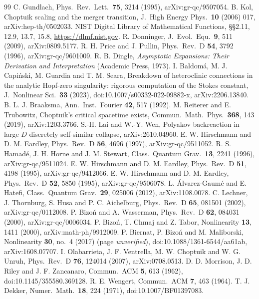 \documentclass[aps,prd,onecolumn,superscriptaddress,nofootinbib,10pt]{revtex4-2}
\begin{document}
\begin{thebibliography}{99}
 C. Gundlach, Phys.\ Rev.\ Lett.\ \textbf{75}, 3214 (1995), arXiv:gr-qc/9507054.
 B. Kol, Choptuik scaling and the merger transition, J.\ High Energy Phys.\ \textbf{10} (2006) 017,
arXiv:hep-th/0502033.
 NIST Digital Library of Mathematical Functions, \S\S2.11, 12.9, 13.7, 15.8, \url{https://dlmf.nist.gov}.
 R. Donninger, J.\ Evol.\ Equ.\ \textbf{9}, 511 (2009), arXiv:0809.5177.
 R. H. Price and J. Pullin, Phys.\ Rev.\ D \textbf{54}, 3792 (1996), arXiv:gr-qc/9601009.
 R. B. Dingle, \emph{Asymptotic Expansions: Their Derivation and Interpretation} (Academic Press,
1973).
 I. Baldom\'a, M. J. Capi\'nski, M. Guardia and T. M. Seara, Breakdown of heteroclinic connections
in the analytic Hopf-zero singularity: rigorous computation of the Stokes constant, J.\ Nonlinear Sci.\ \textbf{33} (2023),
doi:10.1007/s00332-022-09882-x, arXiv:2206.13840.
 B. L. J. Braaksma, Ann.\ Inst.\ Fourier \textbf{42}, 517 (1992).
 M. Reiterer and E. Trubowitz, Choptuik's critical spacetime exists, Commun.\ Math.\ Phys.\
\textbf{368}, 143 (2019), arXiv:1203.3766.
 S.-H. Lai and W.-Y. Wen, Polyakov backreaction in large $D$ discretely self-similar collapse,
arXiv:2610.04960.
 E. W. Hirschmann and D. M. Eardley, Phys.\ Rev.\ D \textbf{56}, 4696 (1997),
arXiv:gr-qc/9511052.
 R. S. Hamad\'e, J. H. Horne and J. M. Stewart, Class.\ Quantum Grav.\ \textbf{13}, 2241
(1996), arXiv:gr-qc/9511024.
 E. W. Hirschmann and D. M. Eardley, Phys.\ Rev.\ D \textbf{51}, 4198 (1995),
arXiv:gr-qc/9412066.
 E. W. Hirschmann and D. M. Eardley, Phys.\ Rev.\ D \textbf{52}, 5850 (1995),
arXiv:gr-qc/9506078.
 L. \'Alvarez-Gaum\'e and E. Hatefi, Class.\ Quantum Grav.\ \textbf{29}, 025006 (2012),
arXiv:1108.0078.
 C. Lechner, J. Thornburg, S. Husa and P. C. Aichelburg, Phys.\ Rev.\ D \textbf{65}, 081501
(2002), arXiv:gr-qc/0112008.
 P. Bizo\'n and A. Wasserman, Phys.\ Rev.\ D \textbf{62}, 084031 (2000), arXiv:gr-qc/0006034.
\bibitem{BizonChmajTabor2000} P. Bizo\'n, T. Chmaj and Z. Tabor, Nonlinearity \textbf{13}, 1411 (2000),
arXiv:math-ph/9912009.
 P. Biernat, P. Bizo\'n and M. Maliborski, Nonlinearity \textbf{30}, no.~4 (2017)
(page \emph{unverified}), doi:10.1088/1361-6544/aa61ab, arXiv:1608.07707.
\bibitem{OlabarrietaEtAl2007} I. Olabarrieta, J. F. Ventrella, M. W. Choptuik and W. G. Unruh, Phys.\ Rev.\ D \textbf{76},
124014 (2007), arXiv:0708.0513.
 D. D. Morrison, J. D. Riley and J. F. Zancanaro, Commun.\ ACM \textbf{5}, 613
(1962), doi:10.1145/355580.369128.
 R. E. Wengert, Commun.\ ACM \textbf{7}, 463 (1964).
\bibitem{Dekker1971} T. J. Dekker, Numer.\ Math.\ \textbf{18}, 224 (1971), doi:10.1007/BF01397083.
\end{thebibliography}
\end{document}
